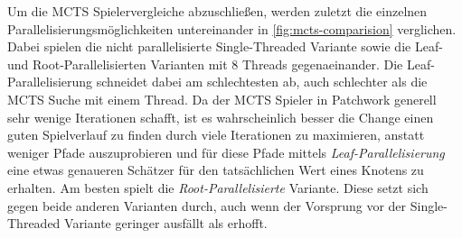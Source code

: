 Um die \ac{MCTS} Spielervergleiche abzuschließen, werden zuletzt die einzelnen Parallelisierungsmöglichkeiten untereinander in \ref{fig:mcts-comparision} verglichen. Dabei spielen die nicht parallelisierte Single-Threaded Variante sowie die Leaf- und Root-Parallelisierten Varianten mit 8 Threads gegenaeinander. Die Leaf-Parallelisierung schneidet dabei am schlechtesten ab, auch schlechter als die \ac{MCTS} Suche mit einem Thread. Da der \ac{MCTS} Spieler in Patchwork generell sehr wenige Iterationen schafft, ist es wahrscheinlich besser die Change einen guten Spielverlauf zu finden durch viele Iterationen zu maximieren, anstatt weniger Pfade auszuprobieren und für diese Pfade mittels \emph{Leaf-Parallelisierung} eine etwas genaueren Schätzer für den tatsächlichen Wert eines Knotens zu erhalten. Am besten spielt die \emph{Root-Parallelisierte} Variante. Diese setzt sich gegen beide anderen Varianten durch, auch wenn der Vorsprung vor der Single-Threaded Variante geringer ausfällt als erhofft.

